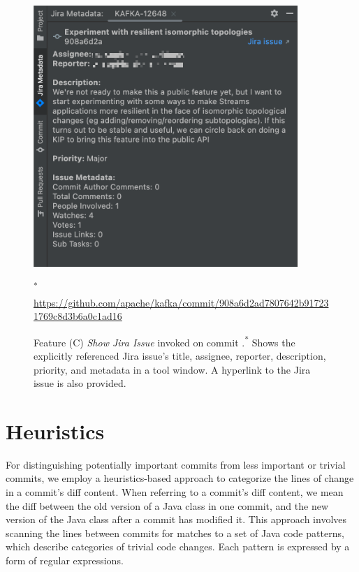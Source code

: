 \begin{figure}[h]
    \center
    \includegraphics[width=10cm]{./images/intelligent-history-C.png}
    \caption{
        Feature (C) \textit{Show Jira Issue} invoked on commit .\textsuperscript{*}
        Shows the explicitly referenced Jira issue's title, assignee, reporter, description, priority, and metadata in a tool window. A hyperlink to the Jira issue is also provided.
    }
    \scriptsize\textsuperscript{*} \url{https://github.com/apache/kafka/commit/908a6d2ad7807642b917231769c8d3b6a0c1ad16}
    \label{fig:Intelligent-History-C}
\end{figure}

\section{Heuristics}
\label{sec:Heuristics}

For distinguishing potentially important commits from less important or trivial commits, we employ a heuristics-based approach to categorize the lines of change in a commit's diff content.
When referring to a commit's diff content, we mean the diff between the old version of a Java class in one commit, and the new version of the Java class after a commit has modified it.
This approach involves scanning the lines between commits for matches to a set of Java code patterns, which describe categories of trivial code changes.
Each pattern is expressed by a form of regular expressions.

